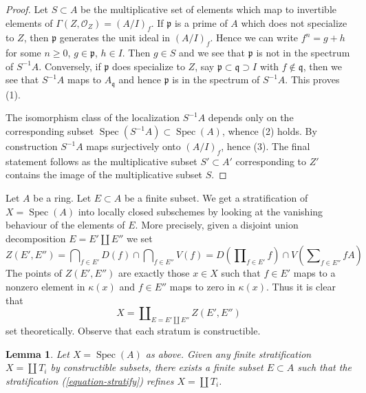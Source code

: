 \documentclass{stacks-project}
\theoremstyle{plain}
\newtheorem{lemma}[subsection]{Lemma}
\theoremstyle{definition}
\theoremstyle{remark}
\numberwithin{equation}{subsection}
\def\Spec{\mathop{\mathrm{Spec}}}
\begin{document}
\begin{proof}
Let $S \subset A$ be the multiplicative set of elements which map
to invertible elements of $\Gamma(Z, \mathcal{O}_Z) = (A/I)_f$.
If $\mathfrak p$ is a prime of $A$ which does not specialize to $Z$,
then $\mathfrak p$ generates the unit ideal in $(A/I)_f$. Hence
we can write $f^n =  g + h$ for some $n \geq 0$, $g \in \mathfrak p$,
$h \in I$. Then $g \in S$ and we see that $\mathfrak p$ is not in
the spectrum of $S^{-1}A$. Conversely, if $\mathfrak p$ does specialize
to $Z$, say $\mathfrak p \subset \mathfrak q \supset I$ with
$f \not \in \mathfrak q$, then we see that $S^{-1}A$ maps to
$A_\mathfrak q$ and hence $\mathfrak p$ is in the spectrum of $S^{-1}A$.
This proves (1).

\medskip\noindent
The isomorphism class of the localization $S^{-1}A$ depends only
on the corresponding subset $\Spec(S^{-1}A) \subset \Spec(A)$, whence
(2) holds. By construction $S^{-1}A$ maps surjectively onto
$(A/I)_f$, hence (3). The final statement follows as the multiplicative subset
$S' \subset A'$ corresponding to $Z'$ contains the image of the
multiplicative subset $S$.
\end{proof}

\noindent
Let $A$ be a ring. Let $E \subset A$ be a finite subset. We get a
stratification of $X = \Spec(A)$ into locally closed subschemes by
looking at the vanishing behaviour of the elements of $E$. More precisely,
given a disjoint union decomposition $E = E' \amalg E''$ we set
\begin{equation}
\label{equation-stratum}
Z(E', E'') =
\bigcap\nolimits_{f \in E'} D(f) \cap \bigcap\nolimits_{f \in E''} V(f) =
D(\prod\nolimits_{f \in E'} f) \cap V( \sum\nolimits_{f \in E''} fA)
\end{equation}
The points of $Z(E', E'')$ are exactly those $x \in X$ such that
$f \in E'$ maps to a nonzero element in $\kappa(x)$ and $f \in E''$
maps to zero in $\kappa(x)$. Thus it is clear that
\begin{equation}
\label{equation-stratify}
X = \coprod\nolimits_{E = E' \amalg E''} Z(E', E'')
\end{equation}
set theoretically. Observe that each stratum is constructible.

\begin{lemma}
\label{lemma-refine}
Let $X = \Spec(A)$ as above. Given any finite stratification
$X = \coprod T_i$ by constructible subsets, there exists a finite
subset $E \subset A$ such that the stratification (\ref{equation-stratify})
refines $X = \coprod T_i$.
\end{lemma}
\end{document}
